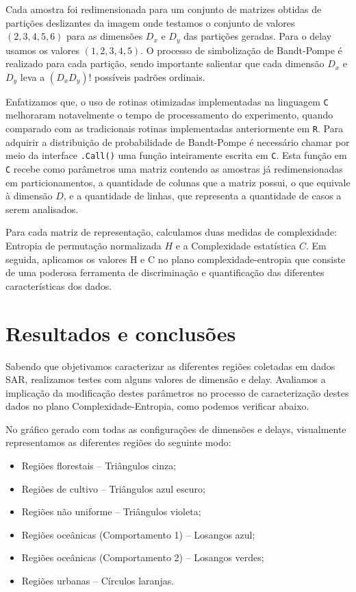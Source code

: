 \documentclass[12pt]{article}
\begin{document}
Cada amostra foi redimensionada para um conjunto de matrizes obtidas de partições deslizantes da imagem onde testamos o conjunto de valores $(2,3,4,5,6)$ para as dimensões $D_{x}$ e $D_{y}$ das partições geradas. Para o delay usamos os valores $(1,2,3,4,5)$. O processo de simbolização de Bandt-Pompe é realizado para cada partição, sendo importante salientar que cada dimensão $D_{x}$ e $D_{y}$ leva a $(D_{x}D_{y})!$ possíveis padrões ordinais. 

Enfatizamos que, o uso de rotinas otimizadas implementadas na linguagem \texttt C melhoraram notavelmente o tempo de processamento do experimento, quando comparado com as tradicionais rotinas implementadas anteriormente em \texttt R. Para adquirir a distribuição de probabilidade de Bandt-Pompe é necessário chamar por meio da interface \texttt{.Call()} uma função inteiramente escrita em \texttt C. Esta função em \texttt C recebe como parâmetros uma matriz contendo as amostras já redimensionadas em particionamentos, a quantidade de colunas que a matriz possui, o que equivale à dimensão $D$, e a quantidade de linhas, que representa a quantidade de casos a serem analisados.

Para cada matriz de representação, calculamos duas medidas de complexidade: Entropia de permutação normalizada $H$ e a Complexidade estatística $C$. Em seguida, aplicamos os valores H e C no plano complexidade-entropia que consiste de uma poderosa ferramenta de discriminação e quantificação das diferentes características dos dados.

\section{Resultados e conclusões}

Sabendo que objetivamos caracterizar as diferentes regiões coletadas em dados SAR, realizamos testes com alguns valores de dimensão e delay. Avaliamos a implicação da modificação destes parâmetros no processo de caracterização destes dados no plano Complexidade-Entropia, como podemos verificar abaixo. 

No gráfico gerado com todas as configurações de dimensões e delays, visualmente representamos as diferentes regiões do seguinte modo:

\begin{itemize}
    \item Regiões florestais -- Triângulos cinza; 
    \item Regiões de cultivo -- Triângulos azul escuro;
    \item Regiões não uniforme -- Triângulos violeta;
    \item Regiões oceânicas (Comportamento 1) -- Losangos azul;
    \item Regiões oceânicas (Comportamento 2) -- Losangos verdes;
    \item Regiões urbanas -- Círculos laranjas.
\end{itemize}
\end{document}
